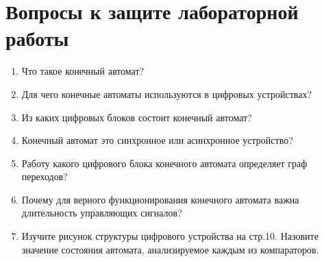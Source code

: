 \clearpage

\section{Вопросы к защите лабораторной работы}

\begin{enumerate}[noitemsep,topsep=0pt, after=\vspace{2pt}]
  \item{Что такое конечный автомат?}
  \item{Для чего конечные автоматы используются в цифровых устройствах?}
  \item{Из каких цифровых блоков состоит конечный автомат?}
  \item{Конечный автомат это синхронное или асинхронное устройство?}
  \item{Работу какого цифрового блока конечного автомата определяет граф переходов?}
  \item{Почему для верного функционирования конечного автомата важна длительность управляющих сигналов?}
  \item{Изучите рисунок структуры цифрового устройства на стр.10. Назовите значение состояния автомата, анализируемое каждым из компараторов.}

\end{enumerate}